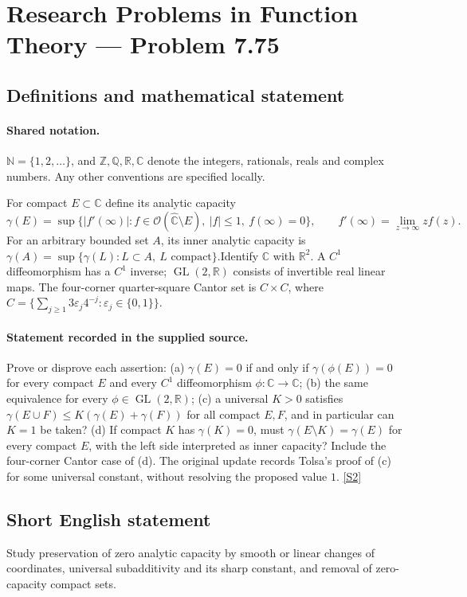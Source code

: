 \documentclass[11pt]{article}
\newcommand{\sref}[2]{\hyperlink{source:#1:#2}{[S#2]}}
\begin{document}
\section{Research Problems in Function Theory — Problem 7.75}\label{statement}

\subsection{Definitions and mathematical statement}

\paragraph{Shared notation.}$\mathbb N=\{1,2,\ldots\}$, and $\mathbb Z,\mathbb Q,\mathbb R,\mathbb C$ denote the integers, rationals, reals and complex numbers. Any other conventions are specified locally.


For compact $E\subset\mathbb C$ define its analytic capacity
\[\gamma(E)=\sup\{|f'(\infty)|: f\in\mathcal O(\widehat{\mathbb C}\setminus E),\ |f|\le1,\ f(\infty)=0\},
\qquad f'(\infty)=\lim_{z\to\infty}zf(z).
\]
For an arbitrary bounded set $A$, its inner analytic capacity is $\gamma(A)=\sup\{\gamma(L):L\subset A,\ L\text{ compact}\}$.Identify $\mathbb C$ with $\mathbb R^2$. A $C^1$ diffeomorphism has a $C^1$ inverse; $\operatorname{GL}(2,\mathbb R)$ consists of invertible real linear maps. The four-corner quarter-square Cantor set is $C\times C$, where $C=\{\sum_{j\ge1}3\varepsilon_j4^{-j}:\varepsilon_j\in\{0,1\}\}$.
\paragraph{Statement recorded in the supplied source.}
Prove or disprove each assertion: (a) $\gamma(E)=0$ if and only if $\gamma(\phi(E))=0$ for every compact $E$ and every $C^1$ diffeomorphism $\phi:\mathbb C\to\mathbb C$; (b) the same equivalence for every $\phi\in\operatorname{GL}(2,\mathbb R)$; (c) a universal $K>0$ satisfies $\gamma(E\cup F)\le K(\gamma(E)+\gamma(F))$ for all compact $E,F$, and in particular can $K=1$ be taken? (d) If compact $K$ has $\gamma(K)=0$, must $\gamma(E\setminus K)=\gamma(E)$ for every compact $E$, with the left side interpreted as inner capacity? Include the four-corner Cantor case of (d). The original update records Tolsa's proof of (c) for some universal constant, without resolving the proposed value $1$. \sref{statement}{2}
\subsection{Short English statement}
Study preservation of zero analytic capacity by smooth or linear changes of coordinates, universal subadditivity and its sharp constant, and removal of zero-capacity compact sets.
\end{document}
